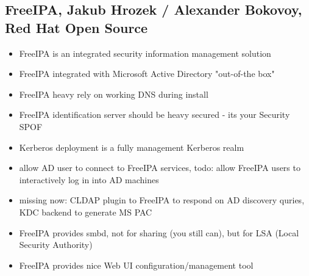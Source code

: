 \documentclass[10pt]{article}
\begin{document}
{\subsection{FreeIPA, Jakub Hrozek / Alexander Bokovoy, Red Hat Open Source}
\begin{itemize}
\item FreeIPA is an integrated security information management solution
\item FreeIPA integrated with Microsoft Active Directory "out-of-the box"
\item FreeIPA heavy rely on working DNS during install
\item FreeIPA identification server should be heavy secured - its your Security SPOF
\item Kerberos deployment is a fully management Kerberos realm
\item allow AD user to connect to FreeIPA services, todo: allow FreeIPA users to interactively log in into AD machines
\item missing now: CLDAP plugin to FreeIPA to respond on AD discovery quries, KDC backend to generate MS PAC
\item FreeIPA provides smbd, not for sharing (you still can), but for LSA (Local Security Authority)
\item FreeIPA provides nice Web UI configuration/management tool
\end{itemize}

}
\end{document}
